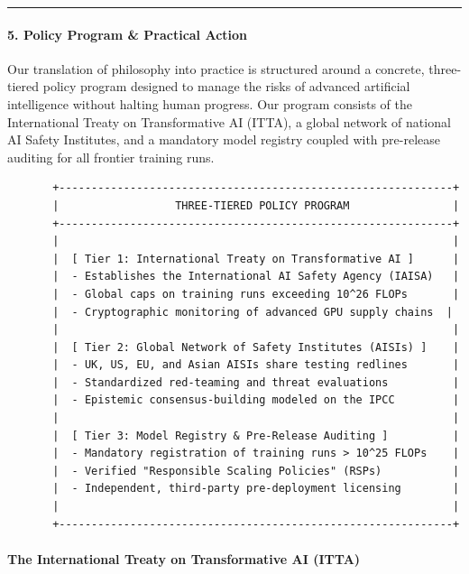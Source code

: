 \begin{center}\rule{0.5\linewidth}{0.5pt}\end{center}

\paragraph{5. Policy Program \& Practical
Action}\label{policy-program-practical-action-1}

Our translation of philosophy into practice is structured around a
concrete, three-tiered policy program designed to manage the risks of
advanced artificial intelligence without halting human progress. Our
program consists of the International Treaty on Transformative AI
(ITTA), a global network of national AI Safety Institutes, and a
mandatory model registry coupled with pre-release auditing for all
frontier training runs.

\begin{verbatim}
       +-------------------------------------------------------------+
       |                  THREE-TIERED POLICY PROGRAM                |
       +-------------------------------------------------------------+
       |                                                             |
       |  [ Tier 1: International Treaty on Transformative AI ]      |
       |  - Establishes the International AI Safety Agency (IAISA)   |
       |  - Global caps on training runs exceeding 10^26 FLOPs       |
       |  - Cryptographic monitoring of advanced GPU supply chains  |
       |                                                             |
       |  [ Tier 2: Global Network of Safety Institutes (AISIs) ]    |
       |  - UK, US, EU, and Asian AISIs share testing redlines       |
       |  - Standardized red-teaming and threat evaluations          |
       |  - Epistemic consensus-building modeled on the IPCC         |
       |                                                             |
       |  [ Tier 3: Model Registry & Pre-Release Auditing ]          |
       |  - Mandatory registration of training runs > 10^25 FLOPs    |
       |  - Verified "Responsible Scaling Policies" (RSPs)           |
       |  - Independent, third-party pre-deployment licensing        |
       |                                                             |
       +-------------------------------------------------------------+
\end{verbatim}

\paragraph{The International Treaty on Transformative AI
(ITTA)}\label{the-international-treaty-on-transformative-ai-itta}

